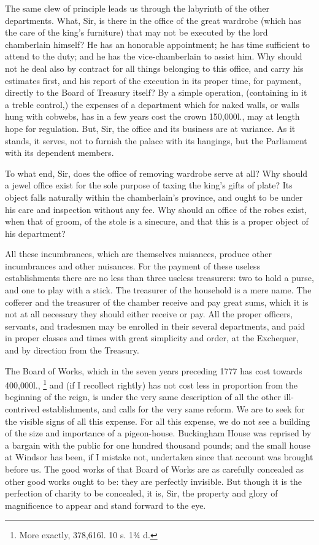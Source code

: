 The same clew of principle leads us through the labyrinth of the other departments. What, Sir, is there in the office of the great wardrobe (which has the care of the king's furniture) that may not be executed by the lord chamberlain himself? He has an honorable appointment; he has time sufficient to attend to the duty; and he has the vice-chamberlain to assist him. Why should not he deal also by contract for all things belonging to this office, and carry his estimates first, and his report of the execution in its proper time, for payment, directly to the Board of Treasury itself? By a simple operation, (containing in it a treble control,) the expenses of a department which for naked walls, or walls hung with cobwebs, has in a few years cost the crown 150,000l., may at length hope for regulation. But, Sir, the office and its business are at variance. As it stands, it serves, not to furnish the palace with its hangings, but the Parliament with its dependent members.

To what end, Sir, does the office of removing wardrobe serve at all? Why should a jewel office exist for the sole purpose of taxing the king's gifts of plate? Its object falls naturally within the chamberlain's province, and ought to be under his care and inspection without any fee. Why should an office of the robes exist, when that of groom, of the stole is a sinecure, and that this is a proper object of his department?

All these incumbrances, which are themselves nuisances, produce other incumbrances and other nuisances. For the payment of these useless establishments there are no less than three useless treasurers: two to hold a purse, and one to play with a stick. The treasurer of the household is a mere name. The cofferer and the treasurer of the chamber receive and pay great sums, which it is not at all necessary they should either receive or pay. All the proper officers, servants, and tradesmen may be enrolled in their several departments, and paid in proper classes and times with great simplicity and order, at the Exchequer, and by direction from the Treasury.

The Board of Works, which in the seven years preceding 1777 has cost towards 400,000l.,
\footnote{ More exactly, 378,616l. 10 s. 1¾ d.}
 and (if I recollect rightly) has not cost less in proportion from the beginning of the reign, is under the very same description of all the other ill-contrived establishments, and calls for the very same reform. We are to seek for the visible signs of all this expense. For all this expense, we do not see a building of the size and importance of a pigeon-house. Buckingham House was reprised by a bargain with the public for one hundred thousand pounds; and the small house at Windsor has been, if I mistake not, undertaken since that account was brought before us. The good works of that Board of Works are as carefully concealed as other good works ought to be: they are perfectly invisible. But though it is the perfection of charity to be concealed, it is, Sir, the property and glory of magnificence to appear and stand forward to the eye.

